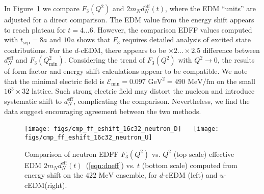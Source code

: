 \documentclass{PoS}
\newcommand{\mcE}{{\mathcal E}}
\begin{document}
In Figure~\ref{fig:dneff_vs_f3} we compare $F_3(Q^2)$ and $2m_N d_N^\text{eff}(t)$, where 
the EDM ``units'' are adjusted for a direct comparison.
The EDM value from the energy shift appears to reach plateau for $t=4\ldots6$. 
However, the comparison EDFF values computed with $t_\text{sep}=8a$ and $10a$ shows that
$F_3$ requires detailed analysis of excited state contributions. 
For the $d$-cEDM, there appears to be $\times2\ldots\times2.5$ difference between
$d_N^\text{eff}$ and $F_3(Q^2_\text{min})$.
Considering the trend of $F_3(Q^2)$ with $Q^2\to0$, the results of form factor and energy shift 
calculations appear to be compatible.
%
We note that the minimal electric field is 
$\mcE_\text{min}=0.097\text{ GeV}^2=490\text{ MeV/fm}$ on the small $16^3\times32$ lattice.
Such strong electric field may distort the nucleon and introduce systematic shift to
$d_N^\text{eff}$, complicating the comparison.
Nevertheless, we find the data suggest encouraging agreement between the two methods.

\begin{figure}[ht!]
\centering
\vspace{-.2cm}
\texttt{[image: figs/cmp\_ff\_eshift\_16c32\_neutron\_D]}~
\hspace{.05\textwidth}~
\texttt{[image: figs/cmp\_ff\_eshift\_16c32\_neutron\_U]}\\
\vspace{-.4cm}
\caption{Comparison of neutron EDFF $F_3(Q^2)$ vs. $Q^2$ (top scale) 
  effective EDM $2 m_N d_N^\text{eff}(t)$~(\ref{eqn:dneff}) vs. $t$ (bottom scale) computed from 
  energy shift on the $422\text{ MeV}$ ensemble, for $d$-cEDM (left) and $u$-cEDM(right).
  \label{fig:dneff_vs_f3} }
\end{figure}
\end{document}
